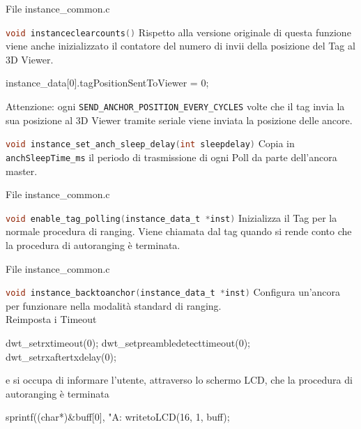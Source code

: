 \begin{frame}[fragile]{File instance\_common.c}
  \begin{block}{\lstinline[language=C]!void instanceclearcounts()! \oldfunction}
    Rispetto alla versione originale di questa funzione viene anche inizializzato il contatore
    del numero di invii della posizione del Tag al 3D Viewer.
    \begin{C}
      instance_data[0].tagPositionSentToViewer = 0;
    \end{C}
    \textcolor{dgreen}{Attenzione:} ogni \lstinline[language=C]!SEND_ANCHOR_POSITION_EVERY_CYCLES! volte che il tag invia la sua posizione al 3D Viewer tramite seriale viene inviata la posizione delle ancore.
  \end{block}
  \begin{block}{\lstinline[language=C]!void instance_set_anch_sleep_delay(int sleepdelay)! \newfunction}
    Copia in \lstinline[language=C]!anchSleepTime_ms! il periodo di trasmissione di ogni Poll da parte dell'ancora master.
  \end{block}
\end{frame}

\begin{frame}{File instance\_common.c}
  \begin{block}{\lstinline[language=C]!void enable_tag_polling(instance_data_t *inst)! \newfunction}
    Inizializza il Tag per la normale procedura di ranging. Viene chiamata
    dal tag quando si rende conto che la procedura di autoranging è terminata.
  \end{block}
\end{frame}

\begin{frame}[fragile]{File instance\_common.c}
  \begin{block}{\lstinline[language=C]!void instance_backtoanchor(instance_data_t *inst)! \oldfunction}
    Configura un'ancora per funzionare nella modalità standard di ranging.\\
    Reimposta i Timeout
    \begin{C}
      dwt_setrxtimeout(0);
      dwt_setpreambledetecttimeout(0);
      dwt_setrxaftertxdelay(0);
    \end{C}
    e si occupa di informare l'utente, attraverso lo schermo LCD, che la procedura di autoranging è terminata
    \begin{C}
      sprintf((char*)&buff[0], "A:%
      writetoLCD(16, 1, buff);
    \end{C}
  \end{block}
\end{frame}

